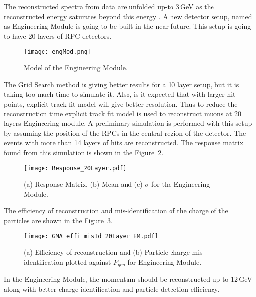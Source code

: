 The reconstructed spectra from data are unfolded up-to 3\,GeV as the
reconstructed energy saturates beyond this energy \cite{daeratio,ratio1}. %
A new detector setup, named as Engineering Module is going to be
built in the near future. This setup is going to have 20 layers of RPC
detectors.
\begin{figure}[h]
  \centering
  \texttt{[image: engMod.png]}
  \caption{Model of the Engineering Module.}
  \label{fig:eng_mod}
\end{figure}
The Grid Search method is giving better results for a 10 layer setup, but it is taking too
much time to simulate it. Also, is it expected that with larger hit points, explicit
track fit model will give better resolution. Thus to reduce the reconstruction time
explicit track fit model is used to reconstruct muons at 20 layers Engineering module.
A preliminary simulation is performed with this setup by assuming the
position of the RPCs in the central region of the detector. The events
with more than 14 layers of hits are reconstructed.
The response matrix found from this simulation is shown in the
Figure~\ref{fig:eng_mod}.
\begin{figure}[h]
  \centering
  \texttt{[image: Response\_20Layer.pdf]}
  \caption{(a) Response Matrix, (b) Mean and (c) $\sigma$ for
    the Engineering Module.}
  \label{fig:eng_mod}
\end{figure}
The efficiency of reconstruction and mis-identification of the charge
of the particles are shown in the Figure~\ref{fig:eng_mod_effi}.
\begin{figure}[h]
  \centering
  \texttt{[image: GMA\_effi\_misId\_20Layer\_EM.pdf]}
  \caption{(a) Efficiency of reconstruction and (b) Particle charge
    mis-identification plotted against $P_{gen}$ for Engineering Module.}
  \label{fig:eng_mod_effi}
\end{figure}
In the Engineering Module, the momentum should be reconstructed
up-to 12\,GeV along with better charge identification and particle
detection efficiency.

